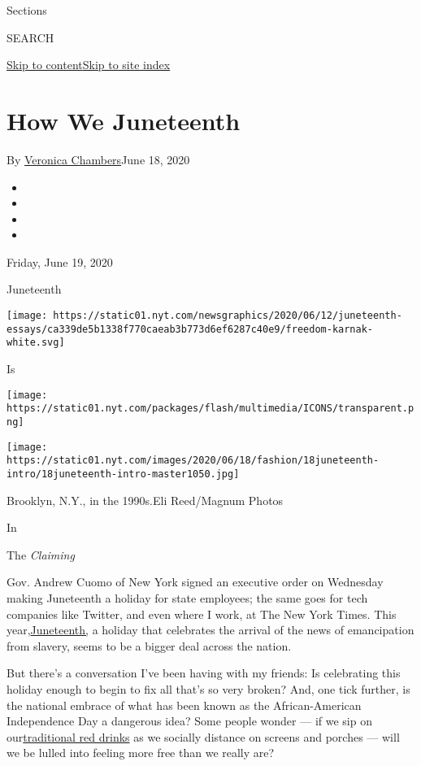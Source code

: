 Sections

SEARCH

\protect\hyperlink{site-content}{Skip to
content}\protect\hyperlink{site-index}{Skip to site index}

\hypertarget{how-we-juneteenth}{%
\section{How We Juneteenth}\label{how-we-juneteenth}}

By \href{https://www.nytimes.com/by/veronica-chambers}{Veronica
Chambers}June 18, 2020

\begin{itemize}
\item
\item
\item
\item
\end{itemize}

Friday, June 19, 2020

Juneteenth

\texttt{[image: https://static01.nyt.com/newsgraphics/2020/06/12/juneteenth-essays/ca339de5b1338f770caeab3b773d6ef6287c40e9/freedom-karnak-white.svg]}

Is

\texttt{[image: https://static01.nyt.com/packages/flash/multimedia/ICONS/transparent.png]}

\texttt{[image: https://static01.nyt.com/images/2020/06/18/fashion/18juneteenth-intro/18juneteenth-intro-master1050.jpg]}

Brooklyn, N.Y., in the 1990s.Eli Reed/Magnum Photos

In

The \emph{Claiming}

Gov. Andrew Cuomo of New York signed an executive order on Wednesday
making Juneteenth a holiday for state employees; the same goes for tech
companies like Twitter, and even where I work, at The New York Times.
This
year,\href{https://www.nytimes.com/article/juneteenth-day-celebration.html}{}\href{https://www.nytimes.com/article/juneteenth-day-celebration.html}{Juneteenth,}
a holiday that celebrates the arrival of the news of emancipation from
slavery, seems to be a bigger deal across the nation.

But there's a conversation I've been having with my friends: Is
celebrating this holiday enough to begin to fix all that's so very
broken? And, one tick further, is the national embrace of what has been
known as the African-American Independence Day a dangerous idea? Some
people wonder --- if we sip on
our\href{https://cooking.nytimes.com/recipes/1021139-edouardo-jordans-juneteenth-red-punch?action=click\&module=Collection\%20Page\%20Recipe\%20Card\&region=Juneteenth\%20Recipes\%20Curated\%20by\%20Nicole\%20Taylor\&pgType=collection\&rank=1}{}\href{https://cooking.nytimes.com/recipes/1021139-edouardo-jordans-juneteenth-red-punch?action=click\&module=Collection\%20Page\%20Recipe\%20Card\&region=Juneteenth\%20Recipes\%20Curated\%20by\%20Nicole\%20Taylor\&pgType=collection\&rank=1}{traditional
red drinks} as we socially distance on screens and porches --- will we
be lulled into feeling more free than we really are?

